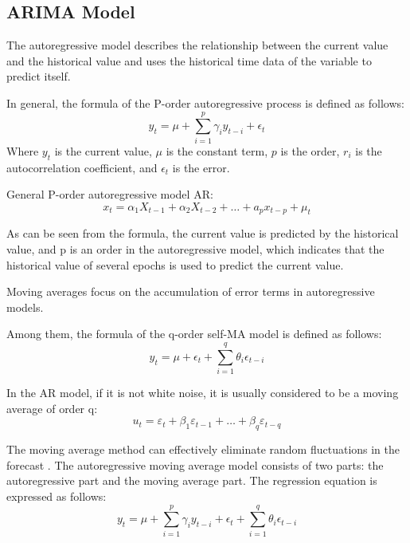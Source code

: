\documentclass[a4paper]{jpconf}
\begin{document}
\subsection{ARIMA Model}
The autoregressive model describes the relationship between the current value and the historical value and uses the historical time data of the variable to predict itself.

In general, the formula of the P-order autoregressive process is defined as follows:
\begin{equation}\label{eq:AR_1}
    y_{t}=\mu+\sum_{i=1}^{p} \gamma_{i} y_{t-i}+\epsilon_{t}
\end{equation}
Where $y_t$ is the current value, $\mu$ is the constant term, $p$ is the order, $r_i$ is the autocorrelation coefficient, and $\epsilon_t$ is the error.


General P-order autoregressive model AR:
\begin{equation}\label{eq:AR_2}
    x_{t}=\alpha_{1} X_{t-1}+\alpha_{2} X_{t-2}+\ldots+a_{p} x_{t-p}+\mu_{t}
\end{equation}

As can be seen from the formula, the current value is predicted by the historical value, and p is an order in the autoregressive model, which indicates that the historical value of several epochs is used to predict the current value.

Moving averages focus on the accumulation of error terms in autoregressive models.

Among them, the formula of the q-order self-MA model is defined as follows:
\begin{equation}\label{eq:MR_1}
    y_{t}=\mu+\epsilon_{t}+\sum_{i=1}^{q} \theta_{i} \epsilon_{t-i}
\end{equation}

In the AR model, if it is not white noise, it is usually considered to be a moving average of order q:
\begin{equation}\label{eq:MR_2}
u_{t}=\varepsilon_{t}+\beta_{1} \varepsilon_{t-1}+\ldots+\beta_{q} \varepsilon_{t-q}
\end{equation}

The moving average method can effectively eliminate random fluctuations in the forecast \cite{siami2018comparison}.
The autoregressive moving average model consists of two parts: the autoregressive part and the moving average part. The regression equation is expressed as follows:
\begin{equation}\label{eq:ARMA}
    y_{t}=\mu+\sum_{i=1}^{p} \gamma_{i} y_{t-i}+\epsilon_{t}+\sum_{i=1}^{q} \theta_{i} \epsilon_{t-i}
\end{equation}
\end{document}
